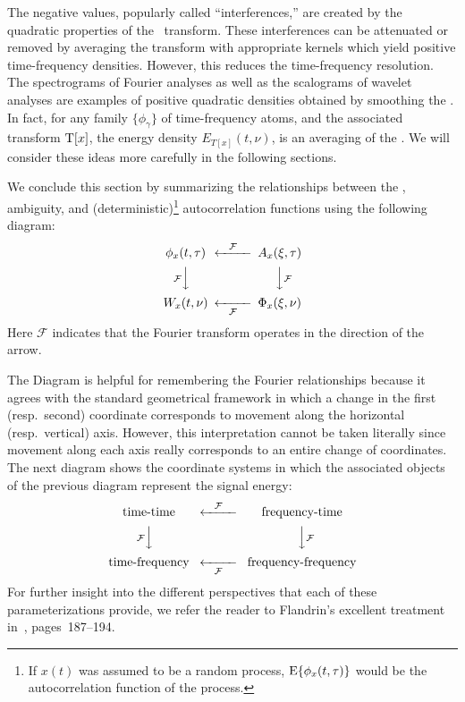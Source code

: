 The negative values, popularly called ``interferences,'' are created
by the quadratic properties of the \WV\ transform.  These
interferences can be attenuated or removed by averaging the transform
with appropriate kernels which yield positive time-frequency
densities.  However, this reduces the time-frequency resolution.  The
spectrograms of Fourier analyses as well as the scalograms of wavelet
analyses are examples of positive quadratic densities obtained by
smoothing the \WT. In fact, for any family $\{\phi_{\gamma}\}$ of
time-frequency atoms, and the associated  transform $\operatorname{T}[x]$, the
energy density $E_{T[x]}(t,\nu)$, is an averaging of the \WT.    
We will consider these ideas more carefully in the following sections.

We conclude this section by summarizing the relationships between the
\WV, ambiguity, and (deterministic)\footnote{If $x(t)$ was assumed to
be a random process, $\operatorname{E}\{\phi_x(t,\tau)\}$ would be the
autocorrelation function of the process.} autocorrelation functions
using the following diagram:
\begin{equation}%
\begin{CD}
\phi_x(t,\tau)  @<\mathcal{F}<< A_x(\xi,\tau)\\
@V\mathcal{F}VV             @VV\mathcal{F}V \\
W_x(t,\nu) @<<\mathcal{F}< \Phi_x(\xi,\nu)
\end{CD}
\end{equation}
Here $\mathcal{F}$ indicates that the Fourier transform operates in
the direction of the arrow.

The Diagram %
is helpful for remembering the Fourier
relationships because it agrees with the standard geometrical
framework in which a change in the first (resp.~second) coordinate
corresponds to movement along the horizontal (resp.~vertical) axis.
However, this interpretation cannot be taken literally since movement
along each axis really corresponds to an entire change of coordinates.
The next diagram shows the coordinate systems in which the
associated objects of the previous diagram represent the signal
energy: 
\[
\begin{CD}
\text{ time-time }  @<\mathcal{F}<< \text{ frequency-time }\\
@V\mathcal{F}VV             @VV\mathcal{F}V \\
\text{ time-frequency } @<<\mathcal{F}< \text{ frequency-frequency }
\end{CD}
\]
For further insight into the different perspectives that each of these
parameterizations provide, we refer the reader to Flandrin's excellent 
treatment in~\cite{Flandrin:1999}, pages~187--194.

